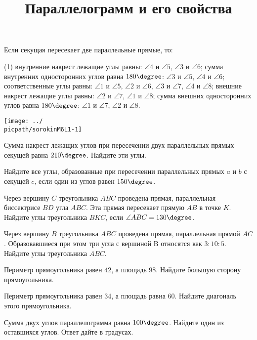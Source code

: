 \begin{class}[number=5-6]
	\begin{definit}
	Если секущая пересекает две параллельные прямые, то:
	\begin{tasks}(1)
		\task внутренние накрест лежащие углы равны: \( \angle 4 \) и \( \angle5 \), \( \angle 3 \) и \( \angle 6\);
		\task сумма внутренних односторонних углов равна  \(180\degree\): \( \angle 3 \) и \( \angle 5 \), \( \angle 4 \) и \( \angle 6 \);
		\task соответственные углы равны: \( \angle 1 \) и \( \angle 5 \), \( \angle 2 \) и \( \angle 6 \), \( \angle 3 \) и \( \angle 7 \), \( \angle 4 \) и \( \angle 8 \);
		\task внешние накрест лежащие углы равны: \( \angle 2 \) и \( \angle 7 \), \( \angle 1 \) и \( \angle 8 \);
		\task сумма внешних односторонних углов равна  \(180\degree\): \( \angle 1 \) и \( \angle 7 \), \( \angle 2 \) и \( \angle 8 \).
	\end{tasks}
	\begin{minipage}[c]{0.9\linewidth}
		\texttt{[image: ../\\picpath/sorokinM6L1-1]}
	\end{minipage}
	\end{definit}
	\begin{listofex}
		\item Сумма накрест лежащих углов при пересечении двух параллельных прямых секущей равна \(210 \degree \). Найдите эти углы.
		\item Найдите все углы, образованные при пересечении параллельных прямых \(a\) и \(b\) с секущей \(c\), если один из углов равен \( 150 \degree \).
		\item Через вершину \(C\) треугольника \(ABC\) проведена прямая, параллельная биссектрисе \(BD\) угла \(ABC\). Эта прямая пересекает прямую \(AB\) в точке \(K\). Найдите углы треугольника \(BKC\), если \(\angle ABC = 130 \degree\).
		\item Через вершину \(B\) треугольника \(ABC\) проведена прямая, параллельная прямой \(AC\). Образовавшиеся при этом три угла с вершиной B относятся как \(3 : 10 : 5\). Найдите углы треугольника \(ABC\).
		\title{Параллелограмм и его свойства}
		\item Периметр прямоугольника равен \( 42 \), а площадь \( 98 \). Найдите большую сторону прямоугольника.
		\item Периметр прямоугольника равен \( 34 \), а площадь равна \( 60 \). Найдите диагональ этого прямоугольника.
		\item Сумма двух углов параллелограмма равна \( 100\degree \). Найдите один из оставшихся углов. Ответ дайте в градусах.		

\end{listofex}
\end{class}
